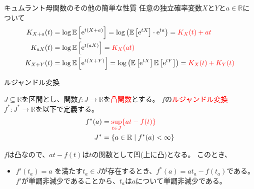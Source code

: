 \documentclass[lualatex,handout]{beamer}
\newcommand{\emm}[1]{\textcolor{red}{#1}}
\newcommand{\expt}[1]{\mathbb{E}\left[#1\right]}
\theoremstyle{definition}
\begin{document}
\begin{frame}{キュムラント母関数のその他の簡単な性質}
\small
任意の独立確率変数$X$と$Y$と$a\in\mathbb{R}$について
\begin{align*}
K_{X+a}(t) &= \log\expt{\mathrm{e}^{t(X+a)}} = \log\left(\expt{\mathrm{e}^{tX}}\cdot \mathrm{e}^{ta}\right) = \emm{K_X(t) + at}\\%
K_{aX}(t) &= \log\expt{\mathrm{e}^{t(aX)}} = \emm{K_X(at)}\\%
K_{X+Y}(t) &= \log\expt{\mathrm{e}^{t(X+Y)}} =\log\left(\expt{\mathrm{e}^{tX}}\expt{\mathrm{e}^{tY}}\right) = \emm{K_X(t) + K_Y(t)}
\end{align*}
\end{frame}

\begin{frame}{ルジャンドル変換}
\begin{definition}
$J\subseteq\mathbb{R}$を区間とし、関数$f\colon J\to\mathbb{R}$を\emm{凸関数}とする。
$f$の\emm{ルジャンドル変換}$f^*\colon J^*\to\mathbb{R}$を以下で定義する。
\begin{align*}
f^*(a) &= \emm{\sup_{t\in J}\{at - f(t)\}}\\
J^*&=\{a\in\mathbb{R}\mid f^*(a)<\infty\}
\end{align*}
\end{definition}

\vspace{1em}
$f$は凸なので、$at-f(t)$は$t$の関数として凹(上に凸)となる。
このとき、
\begin{itemize}
\setlength{\itemsep}{1em}
\item $f'(t_a) = a$ を満たす$t_a\in J$が存在するとき、$f^*(a) = at_a - f(t_a)$である。
$f'$が単調非減少であることから、$t_a$は$a$について単調非減少である。
\end{itemize}
\end{frame}
\end{document}
